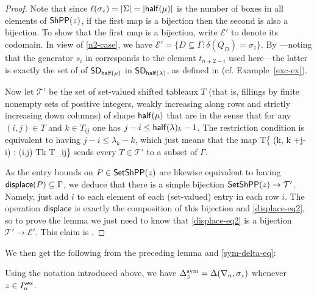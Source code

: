 \documentclass[10pt]{article}
\begin{document}
\begin{proof}
Note that since $\ell(\sigma_z) = |\Sigma|= |\mathsf{half}(\mu)|$
is the number of boxes in all elements of $\mathsf{ShPP}(z)$,
if the first map is a bijection then the second is also a bijection.
To show that the first map is a bijection, write $\mathcal{E}' $ to denote its codomain.
In view of \eqref{n2-case}, we have $\mathcal{E}'  = \{D\subseteq \Gamma : \delta(Q_D) = \sigma_z\}$.
By
\cite[Prop.~5.13(i)]{GrahamKreimanB}---noting that the generator $s_i$ in \cite{GrahamKreimanB} corresponds to the element $t_{n+2-i}$ used here---the latter is exactly the set of 
 of $\mathsf{SD}_{\mathsf{half}(\mu)}$ in $\mathsf{SD}_{\mathsf{half}(\lambda)}$, as defined in \cite[\S5.3]{GrahamKreimanB} (cf. Example~\ref{exc-ex}).


Now let $\mathcal{T}'$ be the set of set-valued shifted tableaux $T$ (that is, fillings by finite nonempty sets of positive integers, weakly increasing along rows and strictly increasing down columns) of shape $\mathsf{half}(\mu)$ that are  in the sense that 
for any $(i,j) \in T$ and $k \in T_{ij}$ one has 
$ j - i \leq  \mathsf{half}(\lambda)_k - 1$.
The restriction condition is equivalent to having $j-i \leq \lambda_k-k$, which just means that the map
\be\label{displace-eq2}
T\mapsto \{ (k, k +j- i) : (i,j) \in Tk \in T_{ij}\}
\ee
sends every $T \in \mathcal{T}'$ to a subset of $\Gamma$.
%

As the entry bounds on $P \in \mathsf{SetShPP}(z)$
are likewise equivalent to having $\mathsf{displace}(P)\subseteq \Gamma$, we deduce that  there is a simple bijection $\mathsf{SetShPP}(z)\to \mathcal{T}'$. Namely, just add $i$ to each element of each (set-valued) entry in each row $i$. The operation $\mathsf{displace}$ is exactly the composition of this bijection and \eqref{displace-eq2},
so to prove the lemma we just need to know that \eqref{displace-eq2} is a bijection 
$\mathcal{T}'\to \mathcal{E}'$. This claim is
 \cite[Prop.~5.18]{GrahamKreimanB}.
\end{proof}
We then get the following from  the preceding lemma and \eqref{sym-delta-eq}:

\begin{corollary}\label{sym-delta-cor}
Using the notation introduced above, we have $\Delta^{\mathrm{sym}}_z = \Delta(\nabla_n,\sigma_z) $ whenever $z \in I^{\mathsf{vex}}_n$.
\end{corollary}
\end{document}
